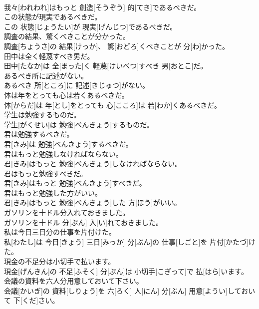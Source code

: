 \documentclass[8pt]{extreport}
\begin{document}
\begin{CJK}{UTF8}{min}
\\	我々[われわれ]はもっと 創造[そうぞう] 的[てき]であるべきだ。
\\	この状態が現実であるべきだ。	
\\	この 状態[じょうたい]が 現実[げんじつ]であるべきだ。
\\	調査の結果、驚くべきことが分かった。	
\\	調査[ちょうさ]の 結果[けっか]、 驚[おどろ]くべきことが 分[わ]かった。
\\	田中は全く軽蔑すべき男だ。	
\\	田中[たなか]は 全[まった]く 軽蔑[けいべつ]すべき 男[おとこ]だ。
\\	あるべき所に記述がない。	
\\	あるべき 所[ところ]に 記述[きじゅつ]がない。
\\	体は年をとっても心は若くあるべきだ。	
\\	体[からだ]は 年[とし]をとっても 心[こころ]は 若[わか]くあるべきだ。
\\	学生は勉強するものだ。	
\\	学生[がくせい]は 勉強[べんきょう]するものだ。
\\	君は勉強するべきだ。	
\\	君[きみ]は 勉強[べんきょう]するべきだ。
\\	君はもっと勉強しなければならない。	
\\	君[きみ]はもっと 勉強[べんきょう]しなければならない。
\\	君はもっと勉強すべきだ。	
\\	君[きみ]はもっと 勉強[べんきょう]すべきだ。
\\	君はもっと勉強した方がいい。	
\\	君[きみ]はもっと 勉強[べんきょう]した 方[ほう]がいい。
\\	ガソリンを十ドル分入れておきました。	
\\	ガソリンを十ドル 分[ぶん] 入[い]れておきました。
\\	私は今日三日分の仕事を片付けた。	
\\	私[わたし]は 今日[きょう] 三日[みっか] 分[ぶん]の 仕事[しごと]を 片付[かたづ]けた。
\\	現金の不足分は小切手で払います。	
\\	現金[げんきん]の 不足[ふそく] 分[ぶん]は 小切手[こぎって]で 払[はら]います。
\\	会議の資料を六人分用意しておいて下さい。	
\\	会議[かいぎ]の 資料[しりょう]を 六[ろく] 人[にん] 分[ぶん] 用意[ようい]しておいて 下[くだ]さい。

\end{CJK}
\end{document}
